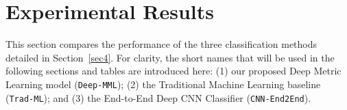 \documentclass[10pt,onecolumn,letterpaper]{article}
\newcommand{\method}[1]{\texttt{#1}}
\begin{document}
\section{Experimental Results}
\label{sec5}

This section compares the performance of the three classification methods detailed in Section~\ref{sec4}. For clarity, the short names that will be used in the following sections and tables are introduced here: (1) our proposed Deep Metric Learning model (\method{Deep-MML}); (2) the Traditional Machine Learning baseline (\method{Trad-ML}); and (3) the End-to-End Deep CNN Classifier (\method{CNN-End2End}). %

\end{document}
